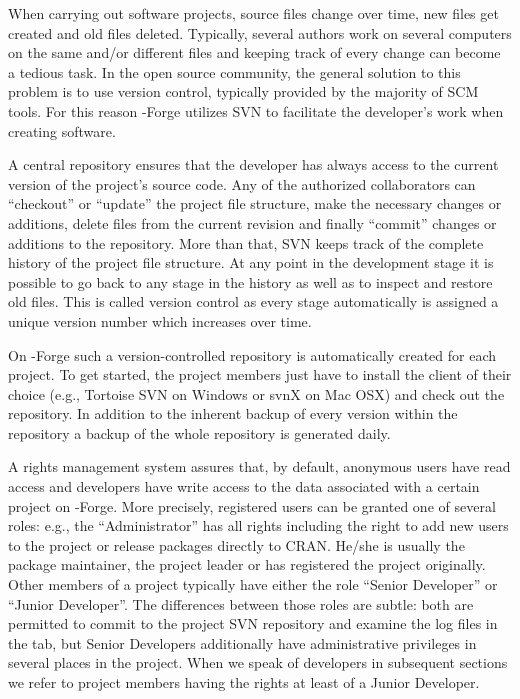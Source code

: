 When carrying out software projects, source files change over time,
new files get created and old files deleted. Typically, several authors
work on several computers on the same and/or different files and keeping
track of every change can become a tedious task. In the open source
community, the general solution to this problem is to use version
control, typically 
provided by the majority of SCM tools. For this reason \R{}-Forge
utilizes SVN to facilitate the developer's work when creating
software.

A central repository ensures that the developer
has always access to the current version of the project's source
code. Any of the authorized collaborators can ``checkout'' or
``update'' the project
file structure, make the necessary changes or additions, delete
files from the current revision and finally ``commit'' changes or
additions to the repository. More than
that, SVN keeps track of the complete history of the project file
structure. At any point in the development stage it is possible to go
back to any stage in the history as well as to inspect and restore old
files. This is called version control as every stage automatically is
assigned a unique version number which increases over time. 

On \R{}-Forge such a version-controlled repository is automatically
created for each project. To get started, the project members just
have to install the client of their choice (e.g., Tortoise SVN on
Windows or svnX on 
Mac OSX) and check out the repository. In addition to the inherent
backup of every version within the repository a backup of the whole
repository is generated daily. 

A rights management system assures that, by default, anonymous users
have read access and developers have write access to the data associated with 
a certain project on \R{}-Forge. More precisely, registered users can
be granted one of several roles: e.g., the ``Administrator'' has
all rights including the right to 
add new users to the project or release packages directly to CRAN.
He/she is usually the package 
maintainer, the project leader or has registered the project originally.
Other members of a project typically have either the role ``Senior 
Developer'' or ``Junior Developer''. The differences between those
roles are subtle: both are permitted to commit to the project SVN
repository and examine the log files in the 
 tab, but Senior Developers additionally have
administrative privileges in several places in the project. 
When we speak of developers in subsequent sections we refer to project
members having the rights at least of a Junior Developer.


